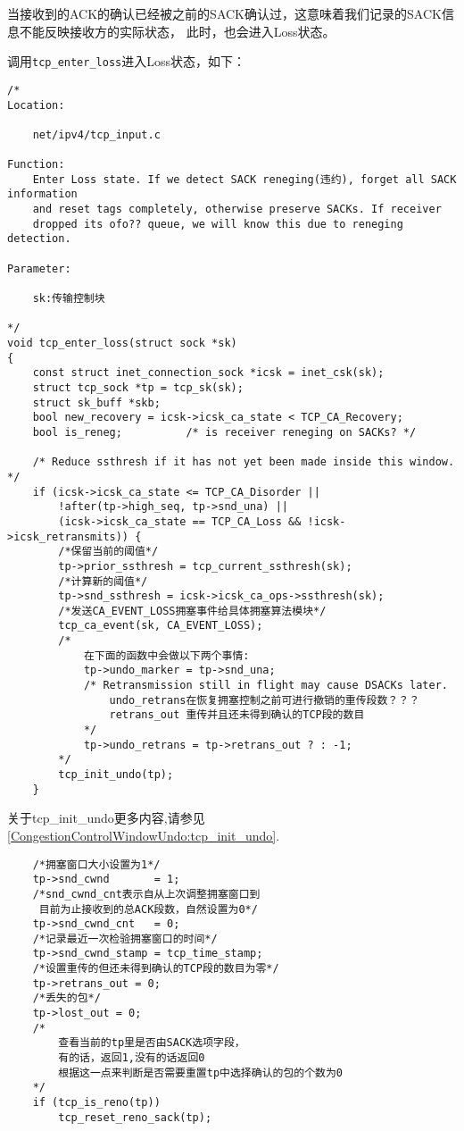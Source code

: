             当接收到的ACK的确认已经被之前的SACK确认过，这意味着我们记录的SACK信息不能反映接收方的实际状态，
            此时，也会进入Loss状态。

            调用\texttt{tcp_enter_loss}进入Loss状态，如下：

\begin{verbatim}
/*
Location:

    net/ipv4/tcp_input.c

Function: 
    Enter Loss state. If we detect SACK reneging(违约), forget all SACK information
    and reset tags completely, otherwise preserve SACKs. If receiver
    dropped its ofo?? queue, we will know this due to reneging detection.

Parameter:

    sk:传输控制块

*/
void tcp_enter_loss(struct sock *sk)
{
    const struct inet_connection_sock *icsk = inet_csk(sk);
    struct tcp_sock *tp = tcp_sk(sk);
    struct sk_buff *skb;
    bool new_recovery = icsk->icsk_ca_state < TCP_CA_Recovery;
    bool is_reneg;          /* is receiver reneging on SACKs? */

    /* Reduce ssthresh if it has not yet been made inside this window. */
    if (icsk->icsk_ca_state <= TCP_CA_Disorder ||
        !after(tp->high_seq, tp->snd_una) ||
        (icsk->icsk_ca_state == TCP_CA_Loss && !icsk->icsk_retransmits)) {
        /*保留当前的阈值*/      
        tp->prior_ssthresh = tcp_current_ssthresh(sk);
        /*计算新的阈值*/        
        tp->snd_ssthresh = icsk->icsk_ca_ops->ssthresh(sk);
        /*发送CA_EVENT_LOSS拥塞事件给具体拥塞算法模块*/     
        tcp_ca_event(sk, CA_EVENT_LOSS);
        /*
            在下面的函数中会做以下两个事情:
            tp->undo_marker = tp->snd_una;
            /* Retransmission still in flight may cause DSACKs later. 
                undo_retrans在恢复拥塞控制之前可进行撤销的重传段数？？？
                retrans_out 重传并且还未得到确认的TCP段的数目
            */
            tp->undo_retrans = tp->retrans_out ? : -1;
        */
        tcp_init_undo(tp);
    }
\end{verbatim}

    关于tcp\_init\_undo更多内容,请参见\ref{CongestionControlWindowUndo:tcp_init_undo}.

\begin{verbatim}
    /*拥塞窗口大小设置为1*/
    tp->snd_cwnd       = 1;
    /*snd_cwnd_cnt表示自从上次调整拥塞窗口到
     目前为止接收到的总ACK段数，自然设置为0*/
    tp->snd_cwnd_cnt   = 0;
    /*记录最近一次检验拥塞窗口的时间*/
    tp->snd_cwnd_stamp = tcp_time_stamp;
    /*设置重传的但还未得到确认的TCP段的数目为零*/
    tp->retrans_out = 0;
    /*丢失的包*/
    tp->lost_out = 0;
    /*
        查看当前的tp里是否由SACK选项字段，
        有的话，返回1,没有的话返回0
        根据这一点来判断是否需要重置tp中选择确认的包的个数为0
    */
    if (tcp_is_reno(tp))
        tcp_reset_reno_sack(tp);
\end{verbatim}

